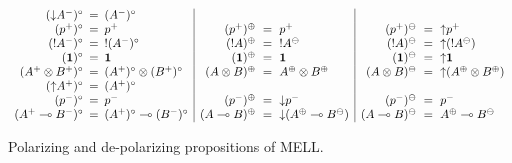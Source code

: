 \begin{figure}
{\small \[
\begin{array}{rcl|rcl|rcl}
({\downarrow}A^-)^\circ & \!\!\!=\!\!\! & (A^-)^\circ & & & & & & 
\\
(p^+)^\circ & \!\!\!=\!\!\! & p^+ &
(p^+)^\oplus & \!\!\!=\!\!\! & p^+ &
(p^+)^\ominus & \!\!\!=\!\!\! & {\uparrow}p^+
\\
({!}A^-)^\circ & \!\!\!=\!\!\! & {!}(A^-)^\circ &
({!}A)^\oplus & \!\!\!=\!\!\! & {!}A^\ominus &
({!}A)^\ominus & \!\!\!=\!\!\! & {\uparrow}({!}A^\ominus)
\\
(\one)^\circ & \!\!\!=\!\!\! & \one &
(\one)^\oplus & \!\!\!=\!\!\! & \one &
(\one)^\ominus & \!\!\!=\!\!\! & {\uparrow}\one 
\\
(A^+ \otimes B^+)^\circ & \!\!\!=\!\!\! & (A^+)^\circ \otimes (B^+)^\circ &
(A \otimes B)^\oplus & \!\!\!=\!\!\! & A^\oplus \otimes B^\oplus &
(A \otimes B)^\ominus & \!\!\!=\!\!\! & {\uparrow}(A^\oplus \otimes B^\oplus)
\\
({\uparrow}A^+)^\circ & \!\!\!=\!\!\! & (A^+)^\circ & & & & & & 
\\
(p^-)^\circ & \!\!\!=\!\!\! & p^- &
(p^-)^\oplus & \!\!\!=\!\!\! & {\downarrow}p^- &
(p^-)^\ominus & \!\!\!=\!\!\! & p^- 
\\
(A^+ \lolli B^-)^\circ & \!\!\!=\!\!\! & (A^+)^\circ \lolli (B^-)^\circ &
(A \lolli B)^\oplus & \!\!\!=\!\!\! & {\downarrow}(A^\oplus \lolli B^\ominus) &
(A \lolli B)^\ominus & \!\!\!=\!\!\! & A^\oplus \lolli B^\ominus
\end{array}
\]}

\caption{Polarizing and de-polarizing propositions of MELL.}
\label{fig:lin-shift}
\end{figure}
